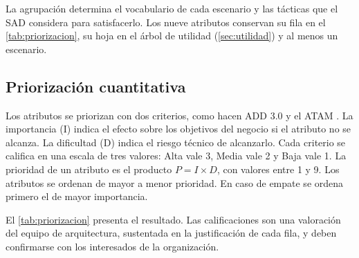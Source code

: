 \documentclass[11pt,letterpaper]{article}
\begin{document}
La agrupación determina el vocabulario de cada escenario y las tácticas que el SAD considera para
satisfacerlo. Los nueve atributos conservan su fila en el \cref{tab:priorizacion}, su hoja en el
árbol de utilidad (\cref{sec:utilidad}) y al menos un escenario.

\subsection{Priorización cuantitativa}
\label{sec:priorizacion}

Los atributos se priorizan con dos criterios, como hacen ADD 3.0 y el ATAM \cite{cervantes,bass}.
La importancia (I) indica el efecto sobre los objetivos del negocio si el atributo no se alcanza.
La dificultad (D) indica el riesgo técnico de alcanzarlo. Cada criterio se califica en una escala
de tres valores: Alta vale 3, Media vale 2 y Baja vale 1. La prioridad de un atributo es el producto
$P = I \times D$, con valores entre 1 y 9. Los atributos se ordenan de mayor a menor prioridad. En
caso de empate se ordena primero el de mayor importancia.

El \cref{tab:priorizacion} presenta el resultado. Las calificaciones son una valoración del equipo
de arquitectura, sustentada en la justificación de cada fila, y deben confirmarse con los
interesados de la organización.
\end{document}

